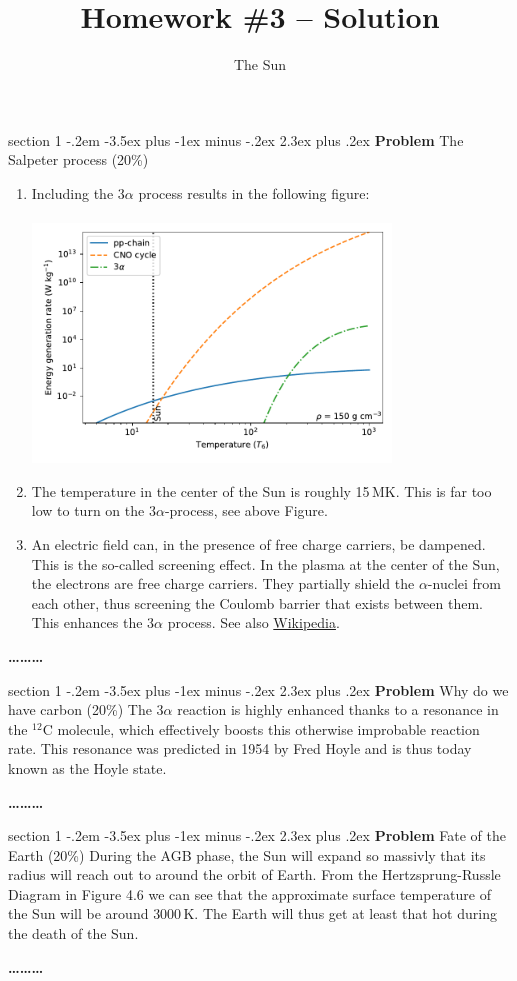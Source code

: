 \documentclass[letterpaper,12pt,twoside=false,DIV=11]{scrartcl}
\makeatletter
\newcommand{\topic}{\author}
\newenvironment{problem}{\@startsection
    {section}
    {1}
    {-.2em}
    {-3.5ex plus -1ex minus -.2ex}
    {2.3ex plus .2ex}
    {
        \pagebreak[3] %
        \noindent\sffamily\bfseries Problem
    }
}
{
    \begin{center}\large\bfseries\ldots\ldots\ldots\end{center}
}
\providecommand{\ex}[1]{\ensuremath{^{#1}}}
\makeatother
\begin{document}
\title{Homework \#3 -- Solution}
\topic{The Sun}

\maketitle
\thispagestyle{fancy}
\begin{problem}{The Salpeter process (20\%)}
\begin{enumerate}
    \item{Including the $3\alpha$ process results in the following figure:\\ \\
    \includegraphics[width=0.75\textwidth]{energy_generation_sun}}
    \item The temperature in the center of the Sun is roughly 15\,MK. This is far too low to turn on the $3\alpha$-process, see above Figure. 
    \item An electric field can, in the presence of free charge carriers, be dampened. This is the so-called screening effect. In the plasma at the center of the Sun, the electrons are free charge carriers. They partially shield the $\alpha$-nuclei from each other, thus screening the Coulomb barrier that exists between them. This enhances the $3\alpha$ process. See also \href{https://en.wikipedia.org/wiki/Electric-field_screening}{Wikipedia}.
\end{enumerate}
\end{problem}

\begin{problem}{Why do we have carbon (20\%)}
The $3\alpha$ reaction is highly enhanced thanks to a resonance in the \ex{12}C molecule, which effectively boosts this otherwise improbable reaction rate. This resonance was predicted in 1954 by Fred Hoyle and is thus today known as the Hoyle state.
\end{problem}

\begin{problem}{Fate of the Earth (20\%)}
During the AGB phase, the Sun will expand so massivly that its radius will reach out to around the orbit of Earth. From the Hertzsprung-Russle Diagram in Figure 4.6 we can see that the approximate surface temperature of the Sun will be around $3000\,$K. The Earth will thus get at least that hot during the death of the Sun.
\end{problem}
\end{document}
